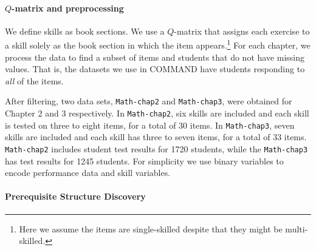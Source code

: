 \documentclass{edm_template}
\begin{document}
	\paragraph{$Q$-matrix and preprocessing}
	\label{sec:preprocessing}
	We define skills as book sections.
	We use a $Q$-matrix that assigns each exercise to a skill solely as the book section in which the item appears.\footnote{Here we assume the items are single-skilled despite that they might be multi-skilled.}
	For each chapter, we process the data to find a subset of items and students that do not have missing values.
	That is, the datasets we use in COMMAND have students responding to \textit{all} of the  items.
	
	After filtering, two data sets, \texttt{Math-chap2} and \texttt{Math-chap3}, were obtained for Chapter 2 and 3 respectively. 
	In \texttt{Math-chap2}, six skills are included and each skill is tested on three to eight items, for a total of 30  items.
	In \texttt{Math-chap3}, seven skills are included and each skill has three to seven items, for a total of 33 items.
	\texttt{Math-chap2} includes student test results for 1720 students, 
	while the \texttt{Math-chap3} has test results for 1245 students.
	For simplicity we use binary variables to encode  performance data and skill variables.
	
	\paragraph{Prerequisite Structure Discovery}
	\label{sec:prerequisite_results}
	
\end{document}
